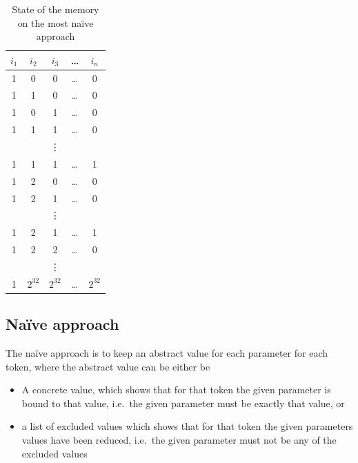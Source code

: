 	\begin{table}
	\caption{State of the memory on the most na\"ive approach}		
	\label{tab:algo:memory}
	\centering
	\begin{tabular}{ccccc}
		\toprule
		$i_1$ &  $i_2$   &  $i_3$   & \dots &  $i_n$   \\ \midrule
		  1   &    0     &    0     & \dots &    0     \\
		  1   &    1     &    0     & \dots &    0     \\
		  1   &    0     &    1     & \dots &    0     \\
		  1   &    1     &    1     & \dots &    0     \\
		      &          &  \vdots  &       &  \\
		  1   &    1     &    1     & \dots &    1     \\
		  1   &    2     &    0     & \dots &    0     \\
		  1   &    2     &    1     & \dots &    0     \\
		      &          &  \vdots  &       &  \\
		  1   &    2     &    1     & \dots &    1     \\
		  1   &    2     &    2     & \dots &    0     \\
		      &          &  \vdots  &       &  \\
		  1   & $2^{32}$ & $2^{32}$ & \dots & $2^{32}$ \\ \bottomrule
	\end{tabular}
	\end{table}
	
	\subsection{Na\"ive approach}	

	The na\"ive approach is to keep an abstract value for each parameter for each token,
	where the abstract value can be either be
	\begin{itemize}
		\item A concrete value, which shows that for that token the given parameter is bound to that value, i.e.~the given parameter must be exactly that value, or
		\item a list of excluded values which shows that for that token the given parameters values have been reduced, i.e.~the given parameter must not be any of the excluded values
	\end{itemize}

